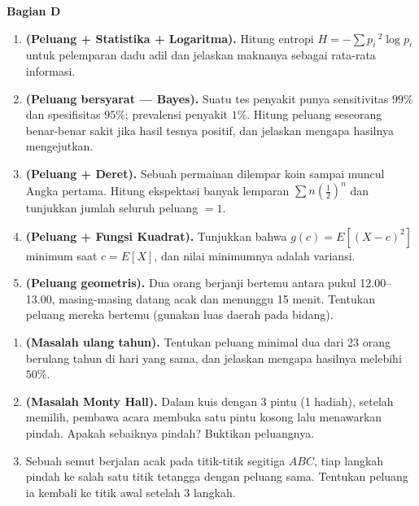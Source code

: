 \documentclass[11pt,a4paper]{report}
\theoremstyle{gaya}
\newcommand{\bagiansoal}[2]{%
  \par\medskip\noindent
  {\large\bfseries\color{biru}Bagian #1}\par\smallskip
  \addcontentsline{toc}{subsection}{Bagian #1}}
\begin{document}
\bagiansoal{D}{Expert (setara tahun pertama universitas --- sintesis antarbab)}
\begin{enumerate}[leftmargin=*]
  \item \textbf{(Peluang + Statistika + Logaritma).} Hitung entropi $H=-\sum p_i\,{}^2\!\log p_i$ untuk pelemparan dadu adil dan jelaskan maknanya sebagai rata-rata informasi.
  \item \textbf{(Peluang bersyarat --- Bayes).} Suatu tes penyakit punya sensitivitas $99\%$ dan spesifisitas $95\%$; prevalensi penyakit $1\%$. Hitung peluang seseorang benar-benar sakit jika hasil tesnya positif, dan jelaskan mengapa hasilnya mengejutkan.
  \item \textbf{(Peluang + Deret).} Sebuah permainan dilempar koin sampai muncul Angka pertama. Hitung ekspektasi banyak lemparan $\sum n(\tfrac12)^n$ dan tunjukkan jumlah seluruh peluang $=1$.
  \item \textbf{(Peluang + Fungsi Kuadrat).} Tunjukkan bahwa $g(c)=E[(X-c)^2]$ minimum saat $c=E[X]$, dan nilai minimumnya adalah variansi.
  \item \textbf{(Peluang geometris).} Dua orang berjanji bertemu antara pukul 12.00--13.00, masing-masing datang acak dan menunggu 15 menit. Tentukan peluang mereka bertemu (gunakan luas daerah pada bidang).
\end{enumerate}

\begin{challenge}
\begin{enumerate}[leftmargin=*,topsep=2pt]
  \item \textbf{(Masalah ulang tahun).} Tentukan peluang minimal dua dari 23 orang berulang tahun di hari yang sama, dan jelaskan mengapa hasilnya melebihi $50\%$.
  \item \textbf{(Masalah Monty Hall).} Dalam kuis dengan 3 pintu (1 hadiah), setelah memilih, pembawa acara membuka satu pintu kosong lalu menawarkan pindah. Apakah sebaiknya pindah? Buktikan peluangnya.
  \item Sebuah semut berjalan acak pada titik-titik segitiga $ABC$, tiap langkah pindah ke salah satu titik tetangga dengan peluang sama. Tentukan peluang ia kembali ke titik awal setelah 3 langkah.
\end{enumerate}
\end{challenge}

\end{document}
